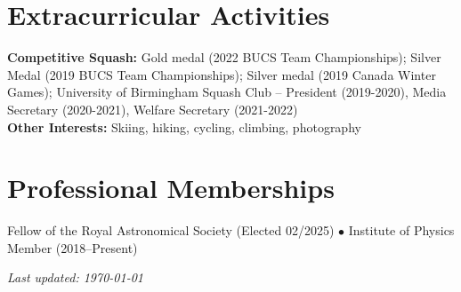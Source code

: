 \documentclass[11pt,a4paper]{article}
\begin{document}
\section*{Extracurricular Activities}
\par\noindent\hspace{1.5em}%
\begin{minipage}[t]{\dimexpr\textwidth-1.5em\relax}
\textbf{Competitive Squash:} Gold medal (2022 BUCS Team Championships); Silver Medal (2019 BUCS Team Championships); Silver medal (2019 Canada Winter Games); University of Birmingham Squash Club -- President (2019-2020), Media Secretary (2020-2021), Welfare Secretary (2021-2022) \\

\noindent\textbf{Other Interests:} Skiing, hiking, cycling, climbing, photography
\end{minipage}\par
\vspace{0.5em}

\section*{Professional Memberships}
\par\noindent\hspace{1.5em}%
\begin{minipage}[t]{\dimexpr\textwidth-1.5em\relax}
Fellow of the Royal Astronomical Society (Elected 02/2025) $\bullet$ Institute of Physics Member (2018--Present)
\end{minipage}\par
\vspace{0.5em}

\vfill
\begin{flushright}
\small\textit{Last updated: \today}
\end{flushright}

\label{LastPage}
\end{document}
